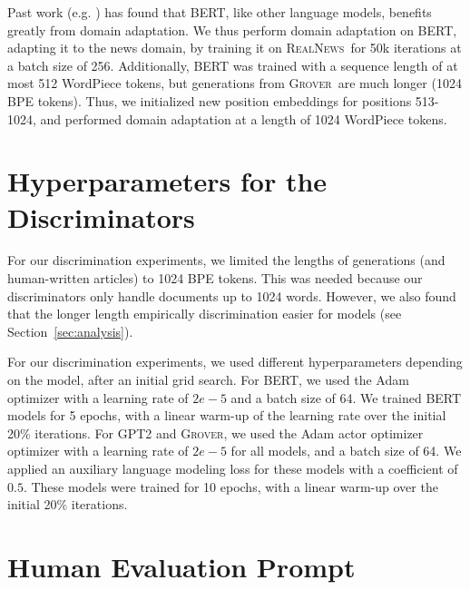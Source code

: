 \documentclass{article}
\newcommand{\modelname}{{\textsc{Grover}}}
\newcommand{\datasetname}{{\textsc{RealNews}}}
\begin{document}
Past work (e.g. \cite{zellers2019vcr, han2019unsupervised}) has found that BERT, like other language models, benefits greatly from domain adaptation.  We thus perform domain adaptation on BERT, adapting it to the news domain, by training it on \datasetname~for 50k iterations at a batch size of 256. Additionally, BERT was trained with a sequence length of at most 512 WordPiece tokens, but generations from \modelname~are much longer (1024 BPE tokens). Thus, we initialized new position embeddings for positions 513-1024, and performed domain adaptation at a length of 1024 WordPiece tokens.

\section{Hyperparameters for the Discriminators}
\label{sec:dischyperparams}
For our discrimination experiments, we limited the lengths of generations (and human-written articles) to 1024 BPE tokens. This was needed because our discriminators only handle documents up to 1024 words. However, we also found that the longer length empirically discrimination easier for models (see Section~\ref{sec:analysis}).

For our discrimination experiments, we used different hyperparameters depending on the model, after an initial grid search. For BERT, we used the Adam \citep{Kingma2014AdamAM} optimizer with a learning rate of $2e-5$ and a batch size of 64. We trained BERT models for 5 epochs, with a linear warm-up of the learning rate over the initial 20\% iterations. For GPT2 and \modelname, we used the Adam actor optimizer \citep{shazeer2018adafactor} optimizer with a learning rate of $2e-5$ for all models, and a batch size of 64. We applied an auxiliary language modeling loss for these models with a coefficient of $0.5$. These models were trained for 10 epochs, with a linear warm-up over the initial 20\% iterations. 

\section{Human Evaluation Prompt}
\label{sec:humanevalprompts}
\end{document}
